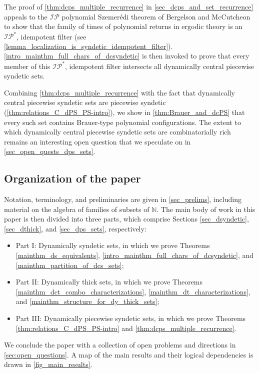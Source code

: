 \documentclass[letter,11pt]{article}
\theoremstyle{plain}
\theoremstyle{definition}
\theoremstyle{plain}
\theoremstyle{plain}
\numberwithin{equation}{section}
\newcommand{\Szemeredi}{Szemer\'{e}di}
\newcommand{\N}{\mathbb{N}}
\newcommand{\IP}{\mathcal{IP}}
\begin{document}
The proof of \cref{thm:dcps_multiple_recurrence} in \cref{sec_dcps_and_set_recurrence} appeals to the $\IP$ polynomial \Szemeredi{} theorem of Bergelson and McCutcheon \cite{Bergelson-McCutcheon-IPpolynomialSzemeredi} to show that the family of times of polynomial returns in ergodic theory is an $\IP^*$, idempotent filter (see \cref{lemma_localization_is_syndetic_idempotent_filter}). \cref{intro_mainthm_full_chars_of_dcsyndetic} is then invoked to prove that every member of this $\IP^*$, idempotent filter intersects all dynamically central piecewise syndetic sets.


Combining \cref{thm:dcps_multiple_recurrence} with the fact that dynamically central piecewise syndetic sets are piecewise syndetic (\cref{thm:relations_C_dPS_PS-intro}), we show in  \cref{thm:Brauer_and_dcPS} that every such set contains Brauer-type polynomial configurations.  The extent to which dynamically central piecewise syndetic sets are combinatorially rich remains an interesting open question that we speculate on in \cref{sec_open_quests_dps_sets}.


\subsection{Organization of the paper}

Notation, terminology, and preliminaries are given in \cref{sec_prelims}, including material on the algebra of families of subsets of $\N$.  The main body of work in this paper is then divided into three parts, which comprise Sections \ref{sec_dsyndetic}, \ref{sec_dthick}, and \ref{sec_dps_sets}, respectively:
\begin{itemize}
    \item[--] Part I: Dynamically syndetic sets, in which we prove Theorems \ref{mainthm_ds_equivalents},  \ref{intro_mainthm_full_chars_of_dcsyndetic}, and \ref{mainthm_partition_of_dcs_sets};
    \item[--] Part II: Dynamically thick sets, in which we prove Theorems \ref{mainthm_dct_combo_characterizations}, \ref{mainthm_dt_characterizations}, and \ref{mainthm_structure_for_dy_thick_sets};
    \item[--] Part III: Dynamically piecewise syndetic sets, in which we prove Theorems \ref{thm:relations_C_dPS_PS-intro} and \ref{thm:dcps_multiple_recurrence}.
\end{itemize}
We conclude the paper with a collection of open problems and directions in \cref{sec:open_questions}.  A map of the main results and their logical dependencies is drawn in \cref{fig_main_results}.
\end{document}
